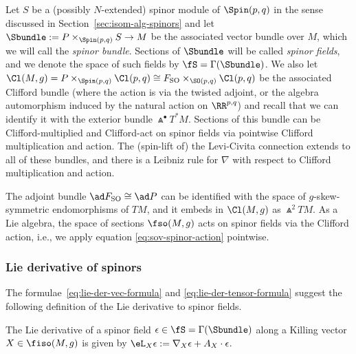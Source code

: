 Let $S$ be a (possibly $N$-extended) spinor module of $\Spin(p,q)$ in the sense discussed in Section~\ref{sec:isom-alg-spinors} and let $\Sbundle:=P\times_{\Spin(p,q)} S\to M$ be the associated vector bundle over $M$, which we will call the \emph{spinor bundle}. Sections of $\Sbundle$ will be called \emph{spinor fields}, and we denote the space of such fields by $\fS=\Gamma(\Sbundle)$. We also let $\Cl(M,g)=P\times_{\Spin(p,q)}\Cl(p,q)\cong F_{\rm SO}\times_{\SO(p,q)}\Cl(p,q)$ be the associated Clifford bundle (where the action is via the twisted adjoint, or the algebra automorphism induced by the natural action on $\RR^{p,q}$) and recall that we can identify it with the exterior bundle $\Wedge^\bullet T^*M$. Sections of this bundle can be Clifford-multiplied and Clifford-act on spinor fields via pointwise Clifford multiplication and action. The (spin-lift of) the Levi-Civita connection extends to all of these bundles, and there is a Leibniz rule for $\nabla$ with respect to Clifford multiplication and action.

The adjoint bundle $\ad F_{\rm SO}\cong\ad P$ can be identified with the space of $g$-skew-symmetric endomorphisms of $TM$, and it embeds in $\Cl(M,g)$ as $\Wedge^2 TM$. As a Lie algebra, the space of sections $\fso(M,g)$ acts on spinor fields via the Clifford action, i.e., we apply equation \eqref{eq:sov-spinor-action} pointwise.

\subsubsection{Lie derivative of spinors}
\label{sec:lie-der-spinors}

The formulae~\eqref{eq:lie-der-vec-formula} and \eqref{eq:lie-der-tensor-formula} suggest the following definition of the Lie derivative to spinor fields.

\begin{Definition}\label{def:lie-der}
	The Lie derivative of a spinor field $\epsilon\in\fS=\Gamma(\Sbundle)$ along a Killing vector $X\in\fiso(M,g)$ is given by
$
		\eL_X \epsilon := \nabla_X \epsilon + A_X\cdot \epsilon$.
\end{Definition}

